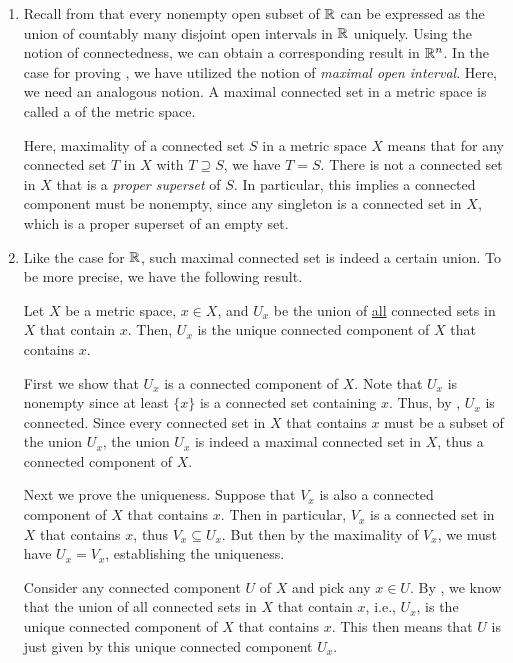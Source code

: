 \begin{enumerate}
\item Recall from  that every nonempty open subset
of \(\mathbb{R}\) can be expressed as the union of countably many disjoint open
intervals in \(\mathbb{R}\) uniquely. Using the notion of connectedness, we can obtain
a corresponding result in \(\mathbb{R}^n\). In the case for proving
, we have utilized the notion of \emph{maximal
open interval}. Here, we need an analogous notion. A maximal connected set in a
metric space is called a  of the metric space.

Here, maximality of a connected set \(S\) in a metric space \(X\) means that
for any connected set \(T\) in \(X\) with \(T\supseteq S\), we have \(T=S\).
There is not a connected set in \(X\) that is a \emph{proper superset} of
\(S\). In particular, this implies a connected component must be nonempty,
since any singleton is a connected set in \(X\), which is a proper superset of
an empty set.

\item Like the case for \(\mathbb{R}\), such maximal connected set is indeed a certain
union. To be more precise, we have the following result.

\begin{proposition}
\label{prp:conn-comp-union}
Let \(X\) be a metric space, \(x\in X\), and \(U_x\) be the union of
\underline{all} connected sets in \(X\) that contain \(x\). Then, \(U_x\) is
the unique connected component of \(X\) that contains \(x\).
\end{proposition}
\begin{pf}
First we show that \(U_x\) is a connected component of \(X\). Note that \(U_x\)
is nonempty since at least \(\{x\}\) is a connected set containing \(x\). Thus,
by , \(U_x\) is connected. Since every
connected set in \(X\) that contains \(x\) must be a subset of the union
\(U_x\), the union \(U_x\) is indeed a maximal connected set in \(X\), thus a
connected component of \(X\).

Next we prove the uniqueness. Suppose that \(V_x\) is also a connected
component of \(X\) that contains \(x\). Then in particular, \(V_x\) is a
connected set in \(X\) that contains \(x\), thus \(V_x\subseteq U_x\). But then
by the maximality of \(V_x\), we must have \(U_x=V_x\), establishing the
uniqueness.
\end{pf}

Consider any connected component \(U\) of \(X\) and pick any \(x\in U\). By
, we know that the union of all connected sets in
\(X\) that contain \(x\), i.e., \(U_x\), is the unique connected component of
\(X\) that contains \(x\). This then means that \(U\) is just given by this
unique connected component \(U_x\).


\end{enumerate}
